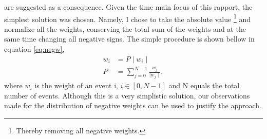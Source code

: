 are suggested as a consequence. Given the time main focus of this rapport, the 
simplest solution was chosen. Namely, I chose to take the absolute value 
\footnote{Thereby removing all negative weights.} and normalize all the weights, 
conserving the total sum of the weights and at the same time changing all 
negative signs. The simple procedure is shown bellow in equation \ref{eq:negw},
\begin{align}\label{eq:negw}
    w_i & = P \mid w_i \mid\,  \\
    P  & =  \sum_{j=0}^{N-1}\frac{ w_j}{\mid w_j \mid},
\end{align}
where $w_i$ is the weight of an event i, $i \in [0,N-1]$ and N equals the total number of events.
Although this is a very simplistic solution, our observations made for the distribution
of negative weights can be used to justify the approach.


